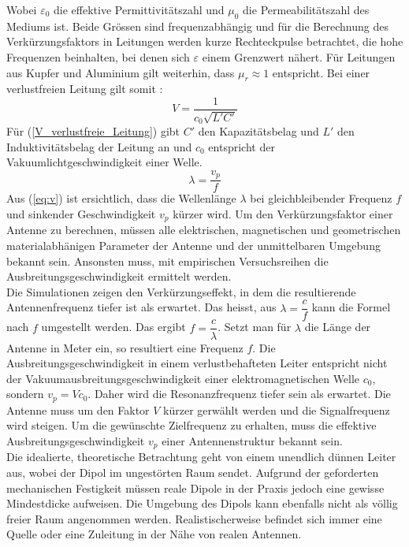Wobei $\varepsilon_0$ die effektive Permittivitätszahl
 und $\mu_0$ die Permeabilitätszahl des Mediums ist. Beide Grössen sind frequenzabhängig und für die Berechnung des Verkürzungsfaktors in Leitungen werden kurze Rechteckpulse betrachtet, die hohe Frequenzen beinhalten, bei denen sich $\varepsilon$ einem Grenzwert nähert. Für Leitungen aus Kupfer und Aluminium gilt weiterhin, dass $\mu_r \approx 1$ entspricht. Bei einer verlustfreien Leitung gilt somit \cite{Verkuertzungsfaktor_wiki}:
\begin{equation}\label{V_verlustfreie_Leitung}
V=\dfrac{1}{c_0 \sqrt{L'C'}} 
\end{equation}
Für (\ref{V_verlustfreie_Leitung}) gibt $C'$ den Kapazitätsbelag und $L'$ den Induktivitätsbelag der Leitung an und $c_0$ entspricht der Vakuumlichtgeschwindigkeit einer Welle.
\begin{equation}\label{eq:v}
\lambda=\dfrac{v_p}{f}
\end{equation} 
Aus (\ref{eq:v}) ist ersichtlich, dass die Wellenlänge $\lambda$ bei gleichbleibender Frequenz $f$ und sinkender Geschwindigkeit $v_p$ kürzer wird. 
Um den Verkürzungsfaktor einer Antenne zu berechnen, müssen alle elektrischen, magnetischen und geometrischen materialabhänigen Parameter der Antenne und der unmittelbaren Umgebung bekannt sein. Ansonsten muss, mit empirischen Versuchsreihen die Ausbreitungsgeschwindigkeit ermittelt werden.\\

\newpage
Die Simulationen zeigen den Verkürzungseffekt, in dem die resultierende Antennenfrequenz tiefer ist als erwartet. Das heisst, aus $\lambda = \dfrac{c}{f}$ kann die Formel nach $f$ umgestellt werden. Das ergibt $f=\dfrac{c}{\lambda}$. Setzt man für $\lambda$ die Länge der Antenne in Meter ein, so resultiert eine Frequenz $f$. Die Ausbreitungsgeschwindigkeit in einem verlustbehafteten Leiter entspricht nicht der Vakuumausbreitungsgeschwindigkeit einer elektromagnetischen Welle $c_0$, sondern $v_p=V c_0$. Daher wird die Resonanzfrequenz tiefer sein als erwartet. Die Antenne muss um den Faktor  $V$ kürzer gerwählt werden und die Signalfrequenz wird steigen. Um die gewünschte Zielfrequenz zu erhalten, muss die effektive Ausbreitungsgeschwindigkeit $v_p$ einer Antennenstruktur bekannt sein.\\

Die idealierte, theoretische Betrachtung geht von einem unendlich dünnen Leiter aus, wobei der Dipol im ungestörten Raum sendet. Aufgrund der geforderten mechanischen Festigkeit müssen reale Dipole in der Praxis jedoch eine gewisse Mindestdicke aufweisen. Die Umgebung des Dipols kann ebenfalls nicht als völlig freier Raum angenommen werden. Realistischerweise befindet sich immer eine Quelle oder eine Zuleitung in der Nähe von realen Antennen. \\

